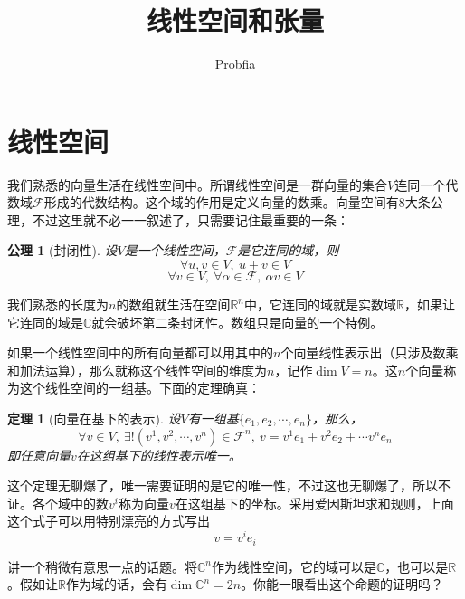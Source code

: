 \documentclass[a4paper,11pt]{ctexart}
\title{线性空间和张量}
\author{Probfia}
\date{}
\newcommand{\beq}{\begin{equation}}
\newcommand{\eeq}{\end{equation}}
\newcommand{\field}{\mathscr{F}}
\newcommand{\reals}{\mathbb{R}}
\newcommand{\complexs}{\mathbb{C}}
\newtheorem{thm}{定理}[section]
\newtheorem{axm}{公理}[section]
\begin{document}
\maketitle
\tableofcontents

\section{线性空间}
我们熟悉的向量生活在线性空间中。所谓线性空间是一群向量的集合$V$连同一个代数域$\field$形成的代数结构。这个域的作用是定义向量的数乘。向量空间有8大条公理，不过这里就不必一一叙述了，只需要记住最重要的一条：
\begin{axm}[封闭性]\par
设$V$是一个线性空间，$\field$是它连同的域，则
\beq
\forall u,v \in V,\ u+v \in V
\eeq
\beq
\forall v \in V,\ \forall \alpha \in \field,\ \alpha v \in V
\eeq
\end{axm}
我们熟悉的长度为$n$的数组就生活在空间$\reals^n$中，它连同的域就是实数域$\reals$，如果让它连同的域是$\complexs$就会破坏第二条封闭性。数组只是向量的一个特例。
\par
如果一个线性空间中的所有向量都可以用其中的$n$个向量线性表示出（只涉及数乘和加法运算），那么就称这个线性空间的维度为$n$，记作$\dim V = n$。这$n$个向量称为这个线性空间的一组基。下面的定理确真：
\begin{thm}[向量在基下的表示]\par
设$V$有一组基$\{e_1,e_2,\cdots,e_n\}$，那么，
\beq
\forall v \in V,\ \exists ! (v^1,v^2,\cdots,v^n) \in \field^n,\ v = v^1 e_1 + v^2 e_2 + \cdots v^n e_n
\eeq
即任意向量$v$在这组基下的线性表示唯一。
\end{thm}
这个定理无聊爆了，唯一需要证明的是它的唯一性，不过这也无聊爆了，所以不证。各个域中的数$v^i$称为向量$v$在这组基下的坐标。采用爱因斯坦求和规则，上面这个式子可以用特别漂亮的方式写出
\beq
v = v^i e_i
\eeq
\par
讲一个稍微有意思一点的话题。将$\complexs^n$作为线性空间，它的域可以是$\complexs$，也可以是$\reals$。假如让$\reals$作为域的话，会有$\dim \complexs^n = 2n$。你能一眼看出这个命题的证明吗？
\end{document}
